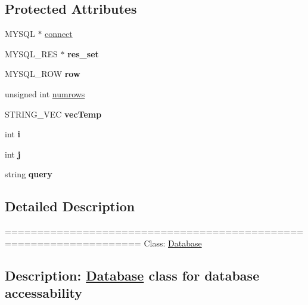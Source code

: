 \subsection*{Protected Attributes}
\begin{DoxyCompactItemize}
\item 
M\-Y\-S\-Q\-L $\ast$ \hyperlink{classDatabase_aa232b806b05ef654cd5579bca5f1dbad}{connect}
\item 
\hypertarget{classDatabase_ad5921cd2f70d0c22895f2cc5542ab4d7}{M\-Y\-S\-Q\-L\-\_\-\-R\-E\-S $\ast$ {\bfseries res\-\_\-set}}\label{classDatabase_ad5921cd2f70d0c22895f2cc5542ab4d7}

\item 
\hypertarget{classDatabase_a71ad7ae59677936d2ca6666f9de9df40}{M\-Y\-S\-Q\-L\-\_\-\-R\-O\-W {\bfseries row}}\label{classDatabase_a71ad7ae59677936d2ca6666f9de9df40}

\item 
unsigned int \hyperlink{classDatabase_a02965883689dd1d8007c86cebf6df89e}{numrows}
\item 
\hypertarget{classDatabase_a88f3a0df87e5e40207100d5b1f7ee6b1}{S\-T\-R\-I\-N\-G\-\_\-\-V\-E\-C {\bfseries vec\-Temp}}\label{classDatabase_a88f3a0df87e5e40207100d5b1f7ee6b1}

\item 
\hypertarget{classDatabase_a1b3174ab4ae9b3cb80448d48817375be}{int {\bfseries i}}\label{classDatabase_a1b3174ab4ae9b3cb80448d48817375be}

\item 
\hypertarget{classDatabase_a5b4fd605238ca66878959f5f3ba647f2}{int {\bfseries j}}\label{classDatabase_a5b4fd605238ca66878959f5f3ba647f2}

\item 
\hypertarget{classDatabase_a851daa5b233ce54d75873631b7b2167a}{string {\bfseries query}}\label{classDatabase_a851daa5b233ce54d75873631b7b2167a}

\end{DoxyCompactItemize}


\subsection{Detailed Description}
=================================================================== Class\-: \hyperlink{classDatabase}{Database} \subsection*{Description\-: \hyperlink{classDatabase}{Database} class for database accessability }

